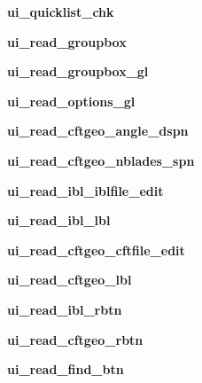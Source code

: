 \begin{DoxyCompactItemize}
{\bfseries ui\+\_\+quicklist\+\_\+chk}
\item 
\hypertarget{a00077_afd5486e4e3b6a77faf883e45beab9a09}{}\label{a00077_afd5486e4e3b6a77faf883e45beab9a09} 
{\bfseries ui\+\_\+read\+\_\+groupbox}
\item 
\hypertarget{a00077_ad90bdfb90daa3db5b3f49ae0b8d8fa8e}{}\label{a00077_ad90bdfb90daa3db5b3f49ae0b8d8fa8e} 
{\bfseries ui\+\_\+read\+\_\+groupbox\+\_\+gl}
\item 
\hypertarget{a00077_a7704bdcb5a1c0e19f4cd1c19c2000b62}{}\label{a00077_a7704bdcb5a1c0e19f4cd1c19c2000b62} 
{\bfseries ui\+\_\+read\+\_\+options\+\_\+gl}
\item 
\hypertarget{a00077_a7bfc8ae9b8e66f044f312dbb91219d88}{}\label{a00077_a7bfc8ae9b8e66f044f312dbb91219d88} 
{\bfseries ui\+\_\+read\+\_\+cftgeo\+\_\+angle\+\_\+dspn}
\item 
\hypertarget{a00077_a96dfb7bb6ab5a36c649090a3d1178c74}{}\label{a00077_a96dfb7bb6ab5a36c649090a3d1178c74} 
{\bfseries ui\+\_\+read\+\_\+cftgeo\+\_\+nblades\+\_\+spn}
\item 
\hypertarget{a00077_a28522bd8330277ba8a1f01fa736cc82f}{}\label{a00077_a28522bd8330277ba8a1f01fa736cc82f} 
{\bfseries ui\+\_\+read\+\_\+ibl\+\_\+iblfile\+\_\+edit}
\item 
\hypertarget{a00077_a297dda79cc86d653c2ba1f5bdef3b70e}{}\label{a00077_a297dda79cc86d653c2ba1f5bdef3b70e} 
{\bfseries ui\+\_\+read\+\_\+ibl\+\_\+lbl}
\item 
\hypertarget{a00077_a5da571d939521a997ec7b05cd5bd7091}{}\label{a00077_a5da571d939521a997ec7b05cd5bd7091} 
{\bfseries ui\+\_\+read\+\_\+cftgeo\+\_\+cftfile\+\_\+edit}
\item 
\hypertarget{a00077_abcf4d4a107f41021d2904f09770d747b}{}\label{a00077_abcf4d4a107f41021d2904f09770d747b} 
{\bfseries ui\+\_\+read\+\_\+cftgeo\+\_\+lbl}
\item 
\hypertarget{a00077_a94bf4df4cc948d1a55752fa45b97099b}{}\label{a00077_a94bf4df4cc948d1a55752fa45b97099b} 
{\bfseries ui\+\_\+read\+\_\+ibl\+\_\+rbtn}
\item 
\hypertarget{a00077_a3ccbf6ded4e6de7d70da7777441a3227}{}\label{a00077_a3ccbf6ded4e6de7d70da7777441a3227} 
{\bfseries ui\+\_\+read\+\_\+cftgeo\+\_\+rbtn}
\item 
\hypertarget{a00077_a94ac3b9c86462bc353b5c9a53b961a7d}{}\label{a00077_a94ac3b9c86462bc353b5c9a53b961a7d} 
{\bfseries ui\+\_\+read\+\_\+find\+\_\+btn}
\item 
\hypertarget{a00077_a16200a07fd06dae2ce5c12674d04b497}{}\label{a00077_a16200a07fd06dae2ce5c12674d04b497} 

\end{DoxyCompactItemize}
